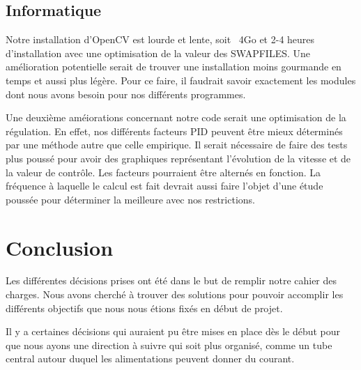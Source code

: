\documentclass[
	a4paper,									%
	11pt,										%
	twoside,									%
	openright,									%
	notitlepage,									%
	parskip=half,								%
]{scrreprt}										%
\begin{document}
\section{Informatique}

Notre installation d'OpenCV est lourde et lente, soit ~4Go et 2-4 heures d'installation
avec une optimisation de la valeur des SWAPFILES. Une amélioration potentielle serait de trouver
une installation moins gourmande en temps et aussi plus légère. Pour ce faire, il faudrait savoir
exactement les modules dont nous avons besoin pour nos différents programmes. \par

Une deuxième améiorations concernant notre code serait une optimisation de la régulation. 
En effet, nos différents facteurs PID peuvent être mieux déterminés par une méthode autre 
que celle empirique. Il serait nécessaire de faire des tests plus poussé pour avoir 
des graphiques représentant l'évolution de la vitesse et de la valeur de contrôle. Les facteurs
pourraient être alternés en fonction. La fréquence à laquelle le calcul est fait devrait aussi 
faire l'objet d'une étude poussée pour déterminer la meilleure avec nos restrictions. \par

\chapter{Conclusion}

Les différentes décisions prises ont été dans le but de remplir notre cahier des charges. 
Nous avons cherché à trouver des solutions pour pouvoir accomplir les différents objectifs que 
nous nous étions fixés en début de projet. \par

Il y a certaines décisions qui auraient pu être mises en place dès le début pour que nous ayons une
direction à suivre qui soit plus organisé, comme un tube central autour duquel les alimentations 
peuvent donner du courant. \par
\end{document}
